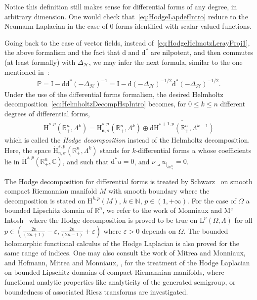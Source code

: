 \documentclass[10pt]{amsart}
\theoremstyle{definition}\newtheorem{defi}[theo]{Definition}\newtheorem{rema}[theo]{Remark}\newtheorem{exam}[theo]{Example}\newtheorem{exem}[theo]{Example}\newtheorem{nota}[theo]{Notation}
\newcommand{\bbP}{\mathbb{P}}
\newcommand{\bbR}{\mathbb{R}}
\newcommand{\bbC}{\mathbb{C}}
\newcommand{\bbN}{\mathbb{N}}
\newcommand{\rmH}{\mathrm{H}}%
\newcommand{\rmd}{\mathrm{d}}
\newcommand{\rmL}{\mathrm{L}}
\newcommand{\rmI}{\mathrm{I}}
\newcommand{\clH}{\mathcal{H}}
\newcommand{\fkn}{\mathfrak{n}}
\newcommand{\iprod}{\mathbin{\lrcorner}}
\begin{document}
Notice this definition still makes sense for differential forms of any degree, in arbitrary dimension. One would check that~\eqref{eq:HodgeLapdefIntro} reduce to the Neumann Laplacian in the case of $0$-forms identified with scalar-valued functions.

Going back to the case of vector fields, instead of~\eqref{eq:HodgeHelmotzLerayProj1}, the above formalism and the fact that $\rmd$ and 
$\rmd^\ast$ are nilpotent, and then commutes (at least formally) with $\Delta_{\clH}$, we may infer the next formula, similar to the one mentioned in~\cite[Section~5]{AuscherCouhlonDuongHofmann2004}:
\begin{align}\label{eq:HodgeHelmotzLerayProj2}
\bbP = \rmI  -\rmd\rmd^\ast(-\Delta_{\clH})^{-1} = \rmI  -\rmd 
(-\Delta_{\clH})^{-1/2}\rmd^\ast(-\Delta_{\clH})^{-1/2} .
\end{align}
Under the use of the differential forms formalism, the desired Helmholtz decomposition~\eqref{eq:HelmholtzDecompHspIntro} becomes, for $0\leqslant k\leqslant n$ different degrees of differential forms,
\begin{align}\label{eq:HodgeDecompHspIntro}
\dot{\rmH}^{s,p}\left(\bbR^n_+,\Lambda^{k}\right) = \dot{\rmH}^{s,p}_{\fkn,\sigma}\left(\bbR^n_+,\Lambda^{k}\right) \oplus \overline{\rmd \dot{\rmH}^{s+1,p}\left(\bbR^n_+,\Lambda^{k-1}\right)}
\end{align}
which is called the \emph{Hodge decomposition} instead of the Helmholtz decomposition. Here, the space $\dot{\rmH}^{s,p}_{\fkn,\sigma}(\bbR^n_+,\Lambda^{k})$ stands for $k$-differential forms $u$ whose coefficients lie in $\dot{\rmH}^{s,p}(\bbR^n_+,\bbC)$, and such that $\rmd^{\ast} u =0$, and $\nu
\iprod u_{|_{\partial \bbR^n_+}} =0$.

The Hodge decomposition for differential forms is treated by Schwarz~\cite[Theorem~2.4.2, Theorem~2.4.14]{Schwartz1995} on smooth compact Riemannian manifold $M$ with smooth boundary where the decomposition is stated on $\rmH^{k,p}(M)$, $k\in\bbN $, $p\in(1,+\infty)$. For the case of $\Omega$ a bounded Lipschitz domain of $\bbR^n$, we refer to the work of Monniaux and 
M${}^{\text{c}}$Intosh~\cite[Theorem~4.3,~Theorem~7.1]{McintoshMonniaux2018} where the Hodge decomposition is proved to be true on $\rmL^p(\Omega,\Lambda)$ for all $p\in(\tfrac{2n}{(2n+1)}-\varepsilon,\tfrac{2n}{(2n-1)}+\varepsilon)$ where $\varepsilon>0$ depends on $\Omega$. The bounded holomorphic functional calculus of the Hodge Laplacian is also proved for the same range of indices. One may also consult the work of Mitrea and Monniaux, and Hofmann, Mitrea and Monniaux, \cite{MitreaMonniaux2009-2,HofmannMitreaMonniaux2011}, for the treatment of the Hodge Laplacian on bounded Lipschitz domains of compact Riemannian manifolds, where functional analytic properties like analyticity of the generated semigroup, or boundedness of associated Riesz transforms are investigated.
\end{document}
